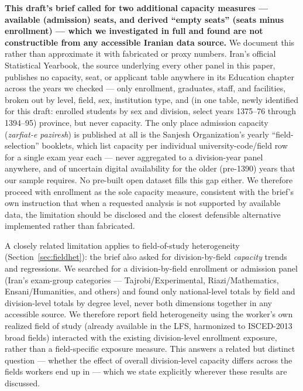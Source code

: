 \documentclass[11pt]{article}
\begin{document}
\textbf{This draft's brief called for two additional capacity measures --- available (admission) seats, and derived ``empty seats'' (seats minus enrollment) --- which we investigated in full and found are not constructible from any accessible Iranian data source.} We document this rather than approximate it with fabricated or proxy numbers. Iran's official Statistical Yearbook, the source underlying every other panel in this paper, publishes no capacity, seat, or applicant table anywhere in its Education chapter across the years we checked --- only enrollment, graduates, staff, and facilities, broken out by level, field, sex, institution type, and (in one table, newly identified for this draft: enrolled students by sex and division, select years 1375--76 through 1394--95) province, but never capacity. The only place admission capacity (\emph{zarfiat-e paziresh}) is published at all is the Sanjesh Organization's yearly ``field-selection'' booklets, which list capacity per individual university-code/field row for a single exam year each --- never aggregated to a division-year panel anywhere, and of uncertain digital availability for the older (pre-1390) years that our sample requires. No pre-built open dataset fills this gap either. We therefore proceed with enrollment as the sole capacity measure, consistent with the brief's own instruction that when a requested analysis is not supported by available data, the limitation should be disclosed and the closest defensible alternative implemented rather than fabricated.

A closely related limitation applies to field-of-study heterogeneity (Section~\ref{sec:fieldhet}): the brief also asked for division-by-field \emph{capacity} trends and regressions. We searched for a division-by-field enrollment or admission panel (Iran's exam-group categories --- Tajrobi/Experimental, Riazi/Mathematics, Ensani/Humanities, and others) and found only national-level totals by field and division-level totals by degree level, never both dimensions together in any accessible source. We therefore report field heterogeneity using the worker's own realized field of study (already available in the LFS, harmonized to ISCED-2013 broad fields) interacted with the existing division-level enrollment exposure, rather than a field-specific exposure measure. This answers a related but distinct question --- whether the effect of overall division-level capacity differs across the fields workers end up in --- which we state explicitly wherever these results are discussed.
\end{document}
